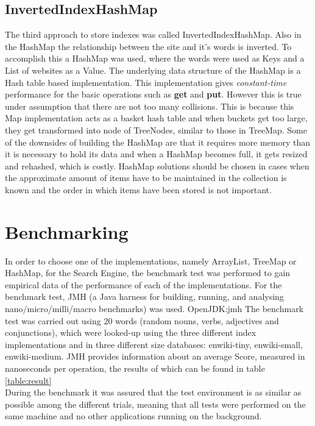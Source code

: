 \subsection{InvertedIndexHashMap}
The third approach to store indexes was called InvertedIndexHashMap. Also in the HashMap the relationship between the site and it's words is inverted. To accomplish this a HashMap was used, where the words were used as Keys and  a List of websites as a Value.
The underlying data structure of the HashMap is a Hash table based implementation. This implementation gives \textit{constant-time} performance for the basic operations such as \textbf{get} and \textbf{put}. \cite{oracle:hashmap} However this is true under assumption that there are not too many collisions. This is because this Map implementation acts as a basket hash table and when buckets get too large, they get transformed into node of TreeNodes, similar to those in TreeMap. \cite{baeldung:HashTreeCompared} Some of the downsides of building the HashMap are that it requires more memory than it is necessary to hold its data and when a HashMap becomes full, it gets resized and rehashed, which is costly. HashMap solutions should be chosen in cases when the approximate amount of items have to be maintained in the collection is known and the order in which items have been stored is not important. \cite{baeldung:HashTreeCompared}


\section{Benchmarking}

In order to choose one of the implementations, namely ArrayList, TreeMap or HashMap, for the Search Engine, the benchmark test was performed to gain empirical data of the performance of each of the implementations. For the benchmark test, JMH (a Java harness for building, running, and analysing nano/micro/milli/macro benchmarks) was used. {OpenJDK:jmh} The benchmark test was carried out using 20 words (random nouns, verbs, adjectives and conjunctions), which were looked-up using the three different index implementations and in three different size databases: enwiki-tiny, enwiki-small, enwiki-medium. JMH provides information about an average Score, measured in nanoseconds per operation, the results of which can be found in table \ref{table:result}\\
During the benchmark it was assured that the test environment is as similar as possible among the different trials, meaning that all tests were performed on the same machine and no other applications running on the background.

